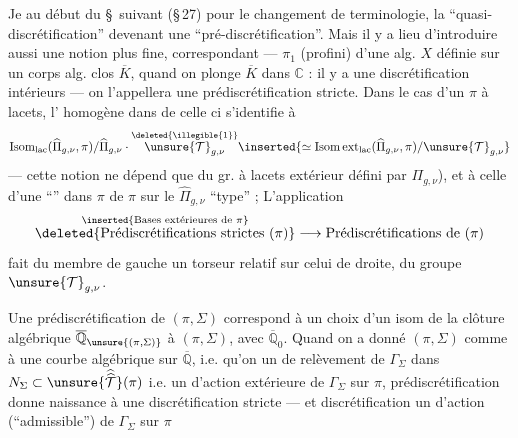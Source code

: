 Je  au début du \S\ suivant (\S\,27) pour le
changement de terminologie, la ``quasi-discrétification''
devenant une ``pré-discrétification''. Mais il y a lieu
d'introduire aussi une notion plus fine, correspondant
---   $\pi_1$ (profini) d'une  alg.
$X$ définie sur un corps alg. clos $\overline K$, quand on plonge
$\overline K$ dans $\mathbb C$ : il y a une discrétification 
 intérieurs --- on l'appellera une
prédiscrétification stricte. Dans le cas d'un
$\pi$ à lacets, l' homogène  dans  de
celle ci s'identifie à
\[
\operatorname{Isom}_{\mathrm{lac}}(\widehat{\Pi}_{g,\nu},\pi)/\widehat{\Pi}_{g,\nu}\cdot
\overset{\deleted{\illegible{1}}}{\unsure{\mathcal T}_{g,\nu}}
\inserted{\simeq\operatorname{Isom\,ext}_{\mathrm{lac}}(\widehat{\Pi}_{g,\nu},\pi)/\unsure{\mathcal T}_{g,\nu}}
\]
--- cette notion  ne dépend que du gr. à lacets
extérieur défini par $\Pi_{g,\nu}$), et  
à celle d'une ``'' dans $\pi$
de $\pi$ sur le $\widehat{\Pi}_{g,\nu}$ ``type'' ;
L'application
\[
\overset{\inserted{\text{Bases extérieures de }\pi}}{\deleted{\text{Prédiscrétifications strictes }(\pi)}}
\longrightarrow \text{Prédiscrétifications de }(\pi)
\]
fait  du membre de gauche un torseur relatif
 sur celui de droite, du groupe $\unsure{\mathcal T}_{g,\nu}$.

Une prédiscrétification de $(\pi,\Sigma)$ correspond à un
choix d'un isom de la clôture algébrique $\overline{\mathbb Q}_{\unsure{(\pi,\Sigma)}}$  
à $(\pi,\Sigma)$, avec $\overline{\mathbb Q}_0$. Quand on a donné $(\pi,\Sigma)$ comme
 à une courbe algébrique sur $\overline{\mathbb Q}$, i.e. qu'on
 un  de relèvement de $\Gamma_\Sigma$ dans $N_\Sigma\subset\unsure{\widehat{\widehat{\mathcal T}}}(\pi)$
i.e. un  d'action extérieure de $\Gamma_\Sigma$ sur $\pi$, 
prédiscrétification  donne naissance à une discrétification
stricte --- et   discrétification  
un  d'action (``admissible'') de $\Gamma_\Sigma$ sur $\pi$ \unsure{\ldots}

